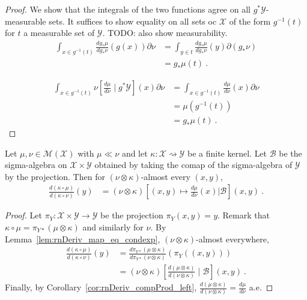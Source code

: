 \begin{proof}%
\uses{}
We show that the integrals of the two functions agree on all $g^* \mathcal Y$-measurable sets. It suffices to show equality on all sets oc $\mathcal X$ of the form $g^{-1}(t)$ for $t$ a measurable set of $\mathcal Y$.
TODO: also show measurability.
\begin{align*}
\int_{x \in g^{-1}(t)}\frac{d g_*\mu}{d g_*\nu}(g(x)) \partial\nu
&= \int_{y \in t}\frac{d g_*\mu}{d g_*\nu}(y) \partial(g_*\nu)
\\
&= g_*\mu (t)
\: .
\end{align*}

\begin{align*}
\int_{x \in g^{-1}(t)}\nu\left[ \frac{d \mu}{d \nu} \mid g^* \mathcal Y\right](x) \partial\nu
&= \int_{x \in g^{-1}(t)}\frac{d \mu}{d \nu}(x) \partial\nu
\\
&= \mu(g^{-1}(t))
\\
&= g_*\mu(t)
\: .
\end{align*}


\end{proof}


\begin{lemma}
  \label{lem:rnDeriv_comp_eq_condexp}
  \uses{}
  Let $\mu, \nu \in \mathcal M(\mathcal X)$ with $\mu \ll \nu$ and let $\kappa : \mathcal X \rightsquigarrow \mathcal Y$ be a finite kernel.
  Let $\mathcal B$ be the sigma-algebra on $\mathcal X \times \mathcal Y$ obtained by taking the comap of the sigma-algebra of $\mathcal Y$ by the projection.
  Then for $(\nu \otimes \kappa)$-almost every $(x,y)$,
  \begin{align*}
  \frac{d(\kappa \circ \mu)}{d(\kappa \circ \nu)}(y)
  &= (\nu \otimes \kappa)\left[ (x, y) \mapsto \frac{d \mu}{d \nu}(x) \Big| \mathcal B \right](x,y)
  \: .
  \end{align*}
  
\end{lemma}

\begin{proof}%
{}
Let $\pi_Y : \mathcal X \times \mathcal Y \to \mathcal Y$ be the projection $\pi_Y(x,y) = y$.
Remark that $\kappa \circ \mu = \pi_{Y*}(\mu \otimes \kappa)$ and similarly for $\nu$.
By Lemma~\ref{lem:rnDeriv_map_eq_condexp}, $(\nu \otimes \kappa)$-almost everywhere,
\begin{align*}
\frac{d(\kappa \circ \mu)}{d(\kappa \circ \nu)}(y)
&= \frac{d \pi_{Y*}(\mu \otimes \kappa)}{d \pi_{Y*}(\nu \otimes \kappa)}(\pi_Y((x,y)))
\\
&= (\nu \otimes \kappa)\left[ \frac{d (\mu \otimes \kappa)}{d (\nu \otimes \kappa)} \mid \mathcal B\right](x,y)
\: .
\end{align*}
Finally, by Corollary~\ref{cor:rnDeriv_compProd_left}, $\frac{d (\mu \otimes \kappa)}{d (\nu \otimes \kappa)} = \frac{d \mu}{d \nu}$ a.e.
\end{proof}